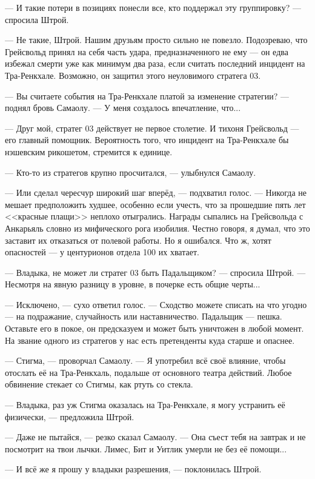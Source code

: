 --- И такие потери в позициях понесли все, кто поддержал эту группировку? --- спросила Штрой.

--- Не такие, Штрой.
Нашим друзьям просто сильно не повезло.
Подозреваю, что Грейсвольд принял на себя часть удара, предназначенного не ему --- он едва избежал смерти уже как минимум два раза, если считать последний инцидент на Тра-Ренкхале.
Возможно, он защитил этого неуловимого стратега 03.

--- Вы считаете события на Тра-Ренкхале платой за изменение стратегии? --- поднял бровь Самаолу.
--- У меня создалось впечатление, что...

--- Друг мой, стратег 03 действует не первое столетие.
И тихоня Грейсвольд --- его главный помощник.
Вероятность того, что инцидент на Тра-Ренкхале бы нэшевским рикошетом, стремится к единице.

--- Кто-то из стратегов крупно просчитался, --- улыбнулся Самаолу.

--- Или сделал чересчур широкий шаг вперёд, --- подхватил голос.
--- Никогда не мешает предположить худшее, особенно если учесть, что за прошедшие пять лет <<красные плащи>> неплохо отыгрались.
Награды сыпались на Грейсвольда с Анкарьяль словно из мифического рога изобилия.
Честно говоря, я думал, что это заставит их отказаться от полевой работы.
Но я ошибался.
Что ж, хотят опасностей --- у центурионов отдела 100 их хватает.

--- Владыка, не может ли стратег 03 быть Падальщиком? --- спросила Штрой.
--- Несмотря на явную разницу в уровне, в почерке есть общие черты...

--- Исключено, --- сухо ответил голос.
--- Сходство можете списать на что угодно --- на подражание, случайность или наставничество.
Падальщик --- пешка.
Оставьте его в покое, он предсказуем и может быть уничтожен в любой момент.
На звание одного из стратегов у нас есть претенденты куда старше и опаснее.

--- Стигма, --- проворчал Самаолу.
--- Я употребил всё своё влияние, чтобы отослать её на Тра-Ренкхаль, подальше от основного театра действий.
Любое обвинение стекает со Стигмы, как ртуть со стекла.

--- Владыка, раз уж Стигма оказалась на Тра-Ренкхале, я могу устранить её физически, --- предложила Штрой.

--- Даже не пытайся, --- резко сказал Самаолу.
--- Она съест тебя на завтрак и не посмотрит на твои лычки.
Лимес, Бит и Уитлик умерли не без её помощи...

--- И всё же я прошу у владыки разрешения, --- поклонилась Штрой.

